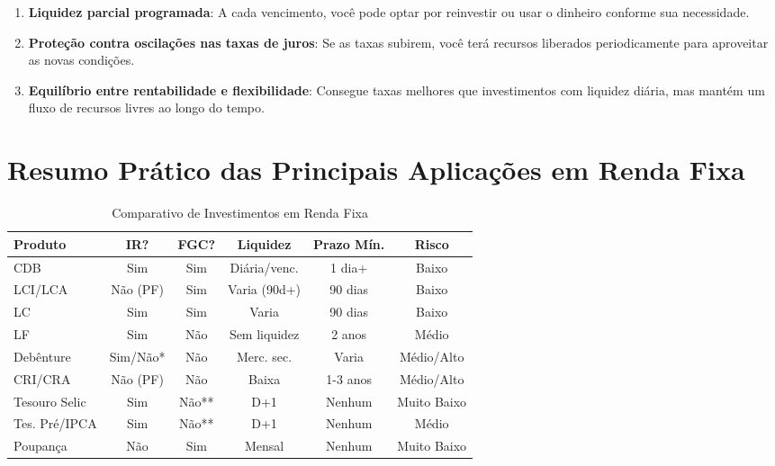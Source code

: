 \begin{enumerate}
    \item \textbf{Liquidez parcial programada}: A cada vencimento, você pode optar por reinvestir ou usar o dinheiro conforme sua necessidade.
    
    \item \textbf{Proteção contra oscilações nas taxas de juros}: Se as taxas subirem, você terá recursos liberados periodicamente para aproveitar as novas condições.
    
    \item \textbf{Equilíbrio entre rentabilidade e flexibilidade}: Consegue taxas melhores que investimentos com liquidez diária, mas mantém um fluxo de recursos livres ao longo do tempo.
\end{enumerate}
\section{Resumo Prático das Principais Aplicações em Renda Fixa}

\begin{table}[ht]
\centering
\begin{tabular}{|p{2cm}|c|c|c|c|c|}
\hline
\textbf{Produto} & \textbf{IR?} & \textbf{FGC?} & \textbf{Liquidez} & \textbf{Prazo Mín.} & \textbf{Risco} \\
\hline
CDB & Sim & Sim & Diária/venc. & 1 dia+ & Baixo \\
\hline
LCI/LCA & Não (PF) & Sim & Varia (90d+) & 90 dias & Baixo \\
\hline
LC & Sim & Sim & Varia & 90 dias & Baixo \\
\hline
LF & Sim & Não & Sem liquidez & 2 anos & Médio \\
\hline
Debênture & Sim/Não* & Não & Merc. sec. & Varia & Médio/Alto \\
\hline
CRI/CRA & Não (PF) & Não & Baixa & 1-3 anos & Médio/Alto \\
\hline
Tesouro Selic & Sim & Não** & D+1 & Nenhum & Muito Baixo \\
\hline
Tes. Pré/IPCA & Sim & Não** & D+1 & Nenhum & Médio \\
\hline
Poupança & Não & Sim & Mensal & Nenhum & Muito Baixo \\
\hline
\end{tabular}
\caption{Comparativo de Investimentos em Renda Fixa}
\label{tab:rendafixa}
\end{table}

\vspace{0.3cm}

